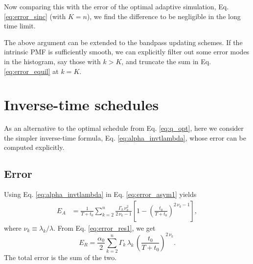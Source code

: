 \documentclass[reprint, floatfix]{revtex4-1}
\newcommand{\Err}{E}
\begin{document}
Now comparing this with the error of
the optimal adaptive simulation,
Eq. \eqref{eq:error_sinc} (with $K = n$),
we find the difference to be negligible
in the long time limit.

The above argument can be extended
to the bandpass updating schemes.
%
If the intrinsic PMF is sufficiently smooth,
we can explicitly filter out some error modes
in the histogram,
say those with $k >  K$,
and truncate the sum in
Eq. \eqref{eq:error_equil} at $k = K$.






\section{\label{sec:invt_schedule}
Inverse-time schedules}



As an alternative to the
optimal schedule from Eq. \eqref{eq:q_opt},
here we consider the simpler
inverse-time formula, Eq. \eqref{eq:alpha_invtlambda},
%
whose error can be computed explicitly.



\subsection{\label{sec:invt_error}
Error
}



Using Eq. \eqref{eq:alpha_invtlambda}
in Eq. \eqref{eq:error_asym1} yields
%
\begin{align}
  \Err_A
  &=
  \frac{    1    }
       { T + t_0 }
  \sum_{k = 2}^n
    \frac{ \Gamma_k \, \nu_k^2 }
         {    2 \, \nu_k - 1   }
  \left[
    1 - \left(
          \frac {     t_0 }
                { T + t_0 }
        \right)^{ 2 \, \nu_k - 1 }
  \right]
  ,
\label{eq:error_asym_invt}
\end{align}
%
where $\nu_k \equiv \lambda_k / \lambda$.
%
From Eq. \eqref{eq:error_res1},
we get
%
\begin{equation}
  \Err_R
  =
  \frac { \alpha_0 } { 2 }
  \sum_{k = 2}^n
  \Gamma_k \, \lambda_k \,
  \left(
      \frac{   t_0   }
           { T + t_0 }
  \right)^{ 2 \, \nu_k }
  .
\label{eq:error_res_invt}
\end{equation}
%
The total error is the sum of the two.
%
%
\end{document}
